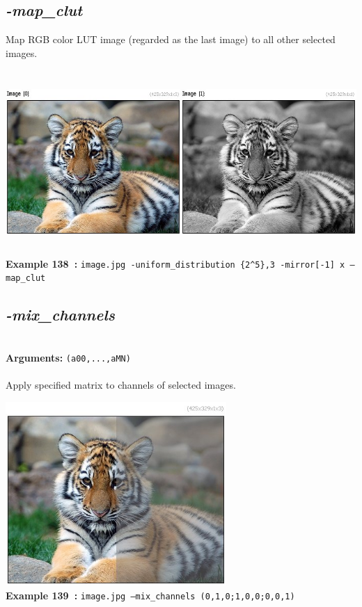\documentclass[a4paper,11pt,twoside]{book}
\begin{document}
\subsection{\emph{-map\_clut} }\vspace*{-0.5em}
Map RGB color LUT image (regarded as the last image) to all other selected images.
\begin{center}\includegraphics[keepaspectratio=true,height=7cm,width=\textwidth]{img/gmic_def138.jpg}\\
{\footnotesize \textbf{Example 138~:} \texttt{image.jpg -uniform\_distribution \{2\textasciicircum 5\},3 -mirror[-1] x --map\_clut}}
\end{center}

\subsection{\emph{-mix\_channels} }\vspace*{-0.5em}
~\\\textbf{Arguments: } 
{\small \texttt{(a00,...,aMN)}}\\~\\
Apply specified matrix to channels of selected images.
\begin{center}\includegraphics[keepaspectratio=true,height=7cm,width=\textwidth]{img/gmic_def139.jpg}\\
{\footnotesize \textbf{Example 139~:} \texttt{image.jpg --mix\_channels (0,1,0;1,0,0;0,0,1)}}
\end{center}
\end{document}
